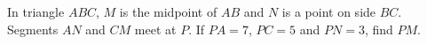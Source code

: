 In triangle $ABC$, $M$ is the midpoint of $AB$ and $N$ is a point on side $BC$. Segments $AN$ and $CM$ meet at $P$. If $PA=7$, $PC=5$ and $PN=3$, find $PM$.
